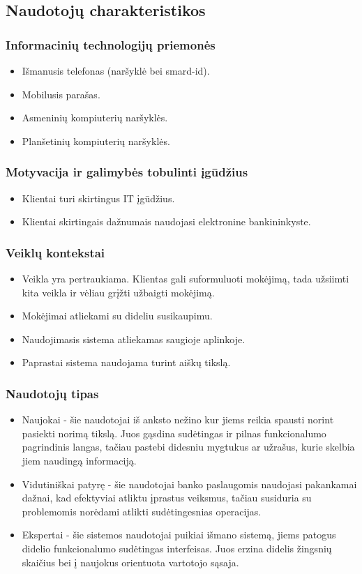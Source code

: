 \documentclass[oneside]{VUMIFPSkursinis}
\begin{document}
\subsection{Naudotojų charakteristikos}
\subsubsection{Informacinių technologijų priemonės}
\begin{itemize}
	\item Išmanusis telefonas (naršyklė bei smard-id).
	\item Mobilusis parašas.
	\item Asmeninių kompiuterių naršyklės.
	\item Planšetinių kompiuterių naršyklės.
\end{itemize}
\subsubsection{Motyvacija ir galimybės tobulinti įgūdžius}
\begin{itemize}
	\item Klientai turi skirtingus IT įgūdžius.
	\item Klientai skirtingais dažnumais naudojasi elektronine bankininkyste.
\end{itemize}
\subsubsection{Veiklų kontekstai}
\begin{itemize}
	\item Veikla yra pertraukiama. Klientas gali suformuluoti mokėjimą, tada užsiimti kita veikla ir vėliau grįžti užbaigti mokėjimą.
	\item Mokėjimai atliekami su dideliu susikaupimu.
	\item Naudojimasis sistema atliekamas saugioje aplinkoje.
	\item Paprastai sistema naudojama turint aiškų tikslą.
\end{itemize}
\subsubsection{Naudotojų tipas}
\begin{itemize}
	\item Naujokai - šie naudotojai iš anksto nežino kur jiems reikia spausti norint pasiekti norimą tikslą. Juos gąsdina sudėtingas ir pilnas funkcionalumo pagrindinis langas, tačiau pastebi didesniu mygtukus ar užrašus, kurie skelbia jiem naudingą informaciją.
	\item Vidutiniškai patyrę - šie naudotojai banko paslaugomis naudojasi pakankamai dažnai, kad efektyviai atliktu įprastus veiksmus, tačiau susiduria su problemomis norėdami atlikti sudėtingesnias operacijas.
	\item Ekspertai - šie sistemos naudotojai puikiai išmano sistemą, jiems patogus didelio funkcionalumo sudėtingas interfeisas. Juos erzina didelis žingsnių skaičius bei į naujokus orientuota vartotojo sąsaja.
\end{itemize}
\end{document}
